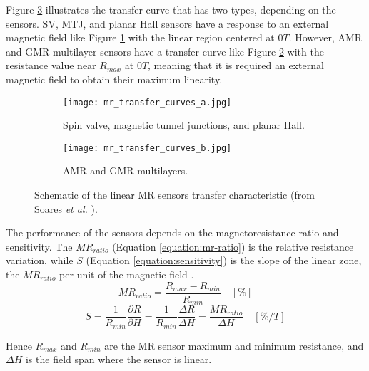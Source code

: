 Figure \ref{figure:mr-transfer-curves} illustrates the transfer curve that has two types, depending on the sensors. \ac{SV}, \ac{MTJ}, and planar Hall sensors have a response to an external magnetic field like Figure \ref{figure:mr-transfer-curves-a} with the linear region centered at $0T$. However, \ac{AMR} and \ac{GMR} multilayer sensors have a transfer curve like Figure \ref{figure:mr-transfer-curves-b} with the resistance value near $R_{max}$ at $0T$, meaning that it is required an external magnetic field to obtain their maximum linearity. 

\begin{figure}[!ht]
    \centering
    \begin{subfigure}[b]{.45\textwidth}
        \centering
        \texttt{[image: mr\_transfer\_curves\_a.jpg]}
        \caption{Spin valve, magnetic tunnel junctions, and planar Hall.}
        \label{figure:mr-transfer-curves-a}
    \end{subfigure}
    \hfill
    \centering
    \begin{subfigure}[b]{.45\textwidth}
        \centering
        \texttt{[image: mr\_transfer\_curves\_b.jpg]}
        \caption{AMR and GMR multilayers.}
        \label{figure:mr-transfer-curves-b}
    \end{subfigure}
    \caption{Schematic of the linear MR sensors transfer characteristic (from Soares \textit{et al.} \cite{Soares2019}).}
    \label{figure:mr-transfer-curves}
\end{figure}

The performance of the sensors depends on the magnetoresistance ratio and sensitivity. The $MR_{ratio}$ (Equation \ref{equation:mr-ratio}) is the relative resistance variation, while $S$ (Equation \ref{equation:sensitivity}) is the slope of the linear zone, the $MR_{ratio}$ per unit of the magnetic field \cite{Soares2019}.
\begin{equation}
\label{equation:mr-ratio}
    MR_{ratio} = \frac{R_{max} - R_{min}}{R_{min}} \quad [\%]
\end{equation}
\begin{equation}
\label{equation:sensitivity}
    S = \frac{1}{R_{min}} \frac{\partial R}{\partial H} = \frac{1}{R_{min}} \frac{\Delta R}{\Delta H} = \frac{MR_{ratio}}{\Delta H} \quad [\%/T]
\end{equation}

\noindent
Hence $R_{max}$ and $R_{min}$ are the \ac{MR} sensor maximum and minimum resistance, and $\Delta H$ is the field span where the sensor is linear.

